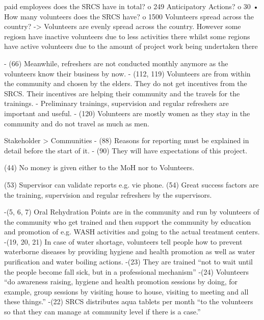 


paid employees does the SRCS have in total?
o	249
Anticipatory Actions?
o	30
•	How many volunteers does the SRCS have?
o	1500
Volunteers spread across the country? 
-> Volunteers are evenly spread across the country.
However some regiosn have inactive volunteers due to less activities there whilst some regions have active volunteers due to the amount of project work being undertaken there










-	(66) Meanwhile, refreshers are not conducted monthly anymore as the volunteers know their business by now. 
-	(112, 119) Volunteers are from within the community and chosen by the elders. They do not get incentives from the SRCS. Their incentives are helping their community and the travels for the trainings.
-	Preliminary trainings, supervision and regular refreshers are important and useful.
-	(120) Volunteers are mostly women as they stay in the community and do not travel as much as men.

Stakeholder > Communities
-	(88) Reasons for reporting must be explained in detail before the start of it.
-	(90) They will have expectations of this project.

(44) No money is given either to the MoH nor to Volunteers.

(53) Supervisor can validate reports e.g. vie phone.
(54) Great success factors are the training, supervision and regular refreshers by the supervisors.


-(5, 6, 7) Oral Rehydration Points are in the community and run by volunteers of the community who get trained and then support the community by education and promotion of e.g. WASH activities and going to the actual treatment centers.
-(19, 20, 21) In case of water shortage, volunteers tell people how to prevent waterborne diseases by providing hygiene and health promotion as well as water purification and water boiling actions.
-(23) They are trained “not to wait until the people become fall sick, but in a professional mechanism”
-(24) Volunteers “do awareness raising, hygiene and health promotion sessions by doing, for example, group sessions by visiting house to house, visiting to meeting and all these things.”
-(22) SRCS distributes aqua tablets per month “to the volunteers so that they can manage at community level if there is a case.”

